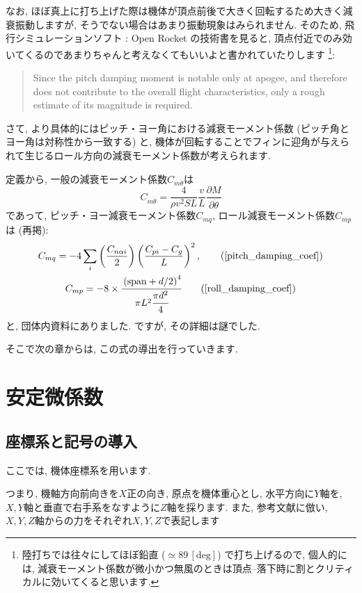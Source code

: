 \documentclass[uplatex,dvipdfmx,a4j,11  pt]{jsarticle}
\begin{document}
なお, ほぼ真上に打ち上げた際は機体が頂点前後で大きく回転するため大きく減衰振動しますが, そうでない場合はあまり振動現象はみられません.
そのため, 飛行シミュレーションソフト : Open Rocket の技術書\cite{openrocket}を見ると, 頂点付近でのみ効いてくるのであまりちゃんと考えなくてもいいよと書かれていたりします
\footnote{陸打ちでは往々にしてほぼ鉛直 ($\simeq 89\,\mathrm{[deg]}$) で打ち上げるので, 個人的には, 減衰モーメント係数が微小かつ無風のときは頂点--落下時に割とクリティカルに効いてくると思います.}:
\begin{quote}
  Since the pitch damping moment is notable only at apogee, and therefore does
not contribute to the overall flight characteristics, only a rough estimate of its
magnitude is required.
\end{quote}

\enskip

さて, より具体的にはピッチ・ヨー角における減衰モーメント係数 (ピッチ角とヨー角は対称性から一致する) と, 機体が回転することでフィンに迎角が与えられて生じるロール方向の減衰モーメント係数が考えられます.

定義から, 一般の減衰モーメント係数$C_{m\dot{\theta}}$は
\begin{equation}
  C_{m\dot{\theta}} = \frac{4}{\rho v^2 S L}\frac{v}{L}\frac{\partial M}{\partial\dot{\theta}} \label{fte_def}
\end{equation}
であって, ピッチ・ヨー減衰モーメント係数$C_{mq}$, ロール減衰モーメント係数$C_{mp}$は (再掲):
\begin{gather*}
  C_{mq} = - 4 \sum_i \left(\frac{C_{n\alpha i}}{2}\right)\left(\frac{C_{pi} - C_{g}}{L}\right)^2,\tag{\ref{pitch_damping_coef}}\\
  C_{mp} = - 8 \times \cfrac{\left(\mathrm{span} + d/2\right)^4}{\pi L^2 \cfrac{\pi d^2}{4}} \tag{\ref{roll_damping_coef}}
\end{gather*}
と, 団体内資料にありました. ですが, その詳細は謎でした. 

そこで次の章からは, この式の導出を行っていきます.

\section{安定微係数}
\subsection{座標系と記号の導入}
ここでは, 機体座標系を用います.

つまり, 機軸方向前向きを$X$正の向き, 原点を機体重心とし, 水平方向に$Y$軸を, $X, Y$軸と垂直で右手系をなすように$Z$軸を採ります.
また, 参考文献\cite{aerodynamics}に倣い, $X, Y, Z$軸からの力をそれぞれ$X, Y, Z$で表記します
\end{document}
